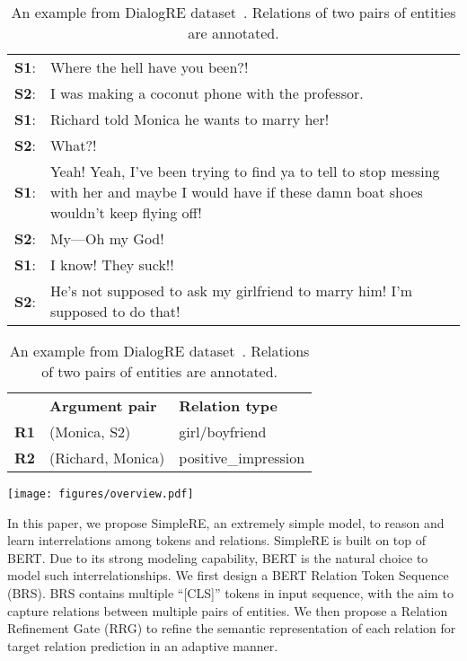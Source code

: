 \documentclass{article}
\begin{document}
\begin{table}[t]
\centering
\caption{An example from DialogRE dataset~\cite{yu-etal-2020-dialogue}. Relations of two pairs of entities are annotated. }
\begin{tabular}{@{}lp{2.57in}}
\toprule
\textbf{S1}: & Where the hell have you been?! \\
\textbf{S2}: & I was making a coconut phone with the professor.\\
\textbf{S1}: & Richard told Monica he wants to marry her!    \\
\textbf{S2}: & What?!     \\
\textbf{S1}: & Yeah! Yeah, I’ve been trying to find ya to tell to stop messing with her and maybe I would have if these damn boat shoes wouldn’t keep flying off!    \\
\textbf{S2}: & My—Oh my God! \\
\textbf{S1}: & I know! They suck!!      \\
\textbf{S2}: & He’s not supposed to ask my girlfriend to marry him! I’m supposed to do that!     \\
\bottomrule
\end{tabular}
\begin{tabular}{@{}llp{1.5in}}
 & \textbf{Argument pair}      & \textbf{Relation type}     \\
\textbf{R1}  & (Monica, S2)       & girl/boyfriend             \\
\textbf{R2}  & (Richard, Monica)  & positive\_impression       \\
\bottomrule
\end{tabular}

\label{tbl-dialog-example}
\end{table}


\begin{figure*}
\centering
\caption{The architecture of SimpleRE. An entity may contain one or more tokens as illustrated.}
\texttt{[image: figures/overview.pdf]}

\label{fig:overview}
\vspace{-2.0em}
\end{figure*}

In this paper, we propose SimpleRE, an extremely simple model, to reason and learn interrelations among tokens and relations. SimpleRE is built on top of BERT. Due to its strong modeling capability, BERT is the natural choice to model such interrelationships. We first design a BERT Relation Token Sequence (BRS). BRS contains multiple ``[CLS]'' tokens in input sequence, with the aim to capture relations between multiple pairs of entities. We then propose a Relation Refinement Gate (RRG) to refine the semantic representation of each relation for target relation prediction in an adaptive manner. 
\end{document}
